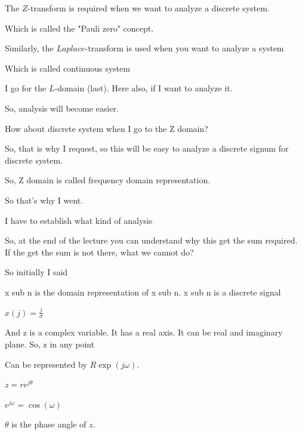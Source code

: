 \documentclass{article}
\begin{document}
The $Z$-transform is required when we want to analyze a discrete system.

Which is called the "Pauli zero" concept.

Similarly, the $Laplace$-transform is used when you want to analyze a system

Which is called continuous system

I go for the $L$-domain (last). Here also, if I want to analyze it.

So, analysis will become easier.

How about discrete system when I go to the Z domain?





So, that is why I request, so this will be easy to analyze a discrete signum for discrete system.

So, Z domain is called frequency domain representation.

So that's why I went.

I have to establish what kind of analysis

So, at the end of the lecture you can understand why this get the sum required. If the get the sum is not there, what we cannot do?



So initially I said

x sub n is the domain representation of x sub n. x sub n is a discrete signal

$x(j) = \frac{j}{\sigma}$



And z is a complex variable. It has a real axis. It can be real and imaginary plane. So, z in any point

Can be represented by $R \exp(j\omega)$.





$z = re^{j\theta}$

$e^{j\omega} = \cos(\omega)$

$\theta$ is the phase angle of $z$.
\end{document}

